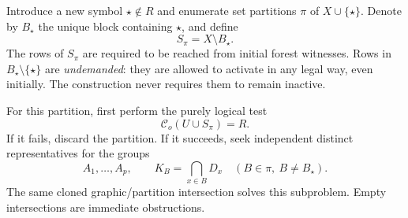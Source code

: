 Introduce a new symbol $\star\notin R$ and enumerate set partitions
$\pi$ of $X\cup\{\star\}$. Denote by $B_\star$ the unique block
containing $\star$, and define
\[
                         S_\pi=X\setminus B_\star.
\]
The rows of $S_\pi$ are required to be reached from initial forest
witnesses. Rows in $B_\star\setminus\{\star\}$ are \emph{undemanded}:
they are allowed to activate in any legal way, even initially. The
construction never requires them to remain inactive.

For this partition, first perform the purely logical test
\begin{equation}
                       \mathcal C_o(U\cup S_\pi)=R.
                       \label{eq:output-closure-test}
\end{equation}
If it fails, discard the partition. If it succeeds, seek independent
distinct representatives for the groups
\begin{equation}
 A_1,\ldots,A_p,\qquad
 K_B=\bigcap_{x\in B}D_x
       \quad(B\in\pi,\ B\ne B_\star).
 \label{eq:output-groups}
\end{equation}
The same cloned graphic/partition intersection solves this subproblem.
Empty intersections are immediate obstructions.


